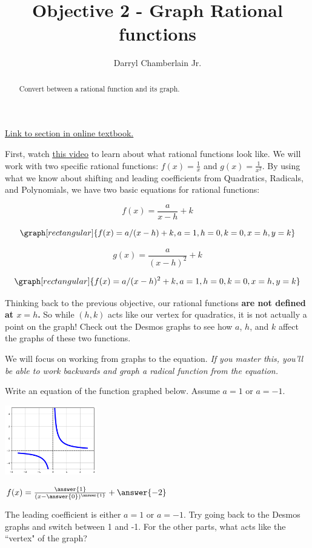 \documentclass{ximera}
\author{Darryl Chamberlain Jr.}
\title{Objective 2 - Graph Rational functions}
\begin{document}
\begin{abstract}
Convert between a rational function and its graph.
\end{abstract}
\maketitle

\href{https://cnx.org/contents/mwjClAV_@8.1:KNTP2r7D@13/Rational-Functions}{Link to section in online textbook.}


First, watch 
\underline{\href{https://mediasite.video.ufl.edu/Mediasite/Play/4cff947227d54f71b32d175099114d3c1d}{this video}} 
to learn about what rational functions look like. We will work with two specific rational functions: $f(x) = \frac{1}{x}$ and $g(x)=\frac{1}{x^2}$. By using what we know about shifting and leading coefficients from Quadratics, Radicals, and Polynomials, we have two basic equations for rational functions: 

$$ f(x) = \frac{a}{x-h} + k $$

\[
\graph[rectangular]{f(x) = a/(x-h) + k, a=1, h=0, k=0, x=h, y=k}
\]

$$ g(x) = \frac{a}{(x-h)^2} + k $$

\[
\graph[rectangular]{f(x) = a/(x-h)^2 + k, a=1, h=0, k=0, x=h, y=k}
\]

Thinking back to the previous objective, our rational functions \textbf{are not defined at $x=h$.} So while $(h, k)$ acts like our vertex for quadratics, it is not actually a point on the graph! Check out the Desmos graphs to see how $a$, $h$, and $k$ affect the graphs of these two functions. 

We will focus on working from graphs to the equation. \textit{If you master this, you'll be able to work backwards and graph a radical function from the equation.} 

\begin{question}
Write an equation of the function graphed below. Assume $a = 1$ or $a=-1$.

	\begin{center}
	    \includegraphics[width = 0.3\textwidth]{graphRationalQ1.png}
	\end{center}

$f(x) = \frac{\answer{1}}{(x - \answer{0})^{\answer{1}}} + \answer{-2}$

\begin{hint}
The leading coefficient is either $a=1$ or $a=-1$. Try going back to the Desmos graphs and switch between 1 and -1. For the other parts, what acts like the ``vertex" of the graph?
\end{hint}
\end{question}
\end{document}
